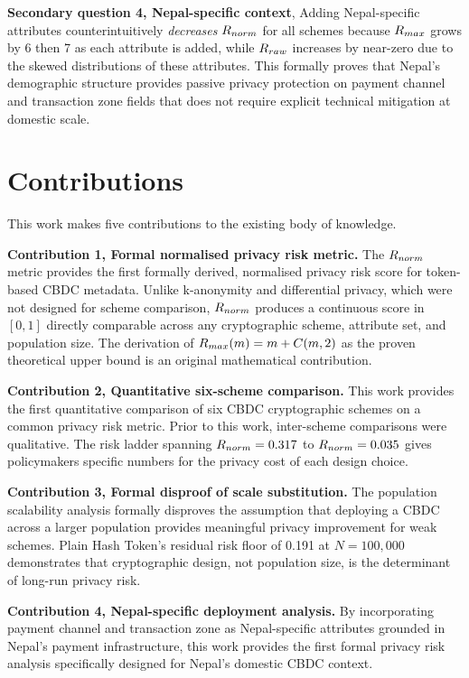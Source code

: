 \textbf{Secondary question 4, Nepal-specific context},
Adding Nepal-specific attributes counterintuitively
\textit{decreases} $R_{norm}$ for all schemes because $R_{max}$
grows by 6 then 7 as each attribute is added, while $R_{raw}$
increases by near-zero due to the skewed distributions of these
attributes. This formally proves that Nepal's demographic
structure provides passive privacy protection on payment channel
and transaction zone fields that does not require explicit
technical mitigation at domestic scale.

\section{Contributions}
\label{sec:contributions}

This work makes five contributions to the existing body of
knowledge.

\textbf{Contribution 1, Formal normalised privacy risk metric.}
The $R_{norm}$ metric provides the first formally derived,
normalised privacy risk score for token-based CBDC metadata.
Unlike k-anonymity and differential privacy, which were not
designed for scheme comparison, $R_{norm}$ produces a continuous
score in $[0, 1]$ directly comparable across any cryptographic
scheme, attribute set, and population size. The derivation of
$R_{max}(m) = m + C(m,2)$ as the proven theoretical upper
bound is an original mathematical contribution.

\textbf{Contribution 2, Quantitative six-scheme comparison.}
This work provides the first quantitative comparison of six
CBDC cryptographic schemes on a common privacy risk metric. Prior
to this work, inter-scheme comparisons were qualitative. The risk
ladder spanning $R_{norm} = 0.317$ to $R_{norm} = 0.035$ gives
policymakers specific numbers for the privacy cost of each design
choice.

\textbf{Contribution 3, Formal disproof of scale substitution.}
The population scalability analysis formally disproves the
assumption that deploying a CBDC across a larger population
provides meaningful privacy improvement for weak schemes. Plain
Hash Token's residual risk floor of 0.191 at $N = 100{,}000$
demonstrates that cryptographic design, not population size, is
the determinant of long-run privacy risk.

\textbf{Contribution 4, Nepal-specific deployment analysis.}
By incorporating payment channel and transaction zone as
Nepal-specific attributes grounded in Nepal's payment
infrastructure, this work provides the first formal privacy risk
analysis specifically designed for Nepal's domestic CBDC context.

